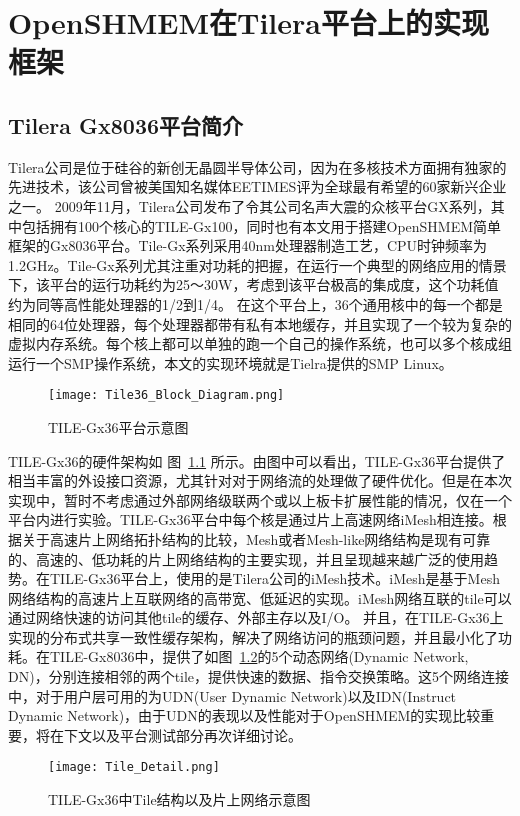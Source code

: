 \chapter{OpenSHMEM在Tilera平台上的实现框架}
\section{Tilera Gx8036平台简介}

Tilera公司是位于硅谷的新创无晶圆半导体公司，因为在多核技术方面拥有独家的先进技术，该公司曾被美国知名媒体EETIMES评为全球最有希望的60家新兴企业之一。
2009年11月，Tilera公司发布了令其公司名声大震的众核平台GX系列，其中包括拥有100个核心的TILE-Gx100，同时也有本文用于搭建OpenSHMEM简单框架的Gx8036平台。Tile-Gx系列采用40nm处理器制造工艺，CPU时钟频率为1.2GHz。Tile-Gx系列尤其注重对功耗的把握，在运行一个典型的网络应用的情景下，该平台的运行功耗约为25～30W，考虑到该平台极高的集成度，这个功耗值约为同等高性能处理器的1/2到1/4。
在这个平台上，36个通用核中的每一个都是相同的64位处理器，每个处理器都带有私有本地缓存，并且实现了一个较为复杂的虚拟内存系统。每个核上都可以单独的跑一个自己的操作系统，也可以多个核成组运行一个SMP操作系统，本文的实现环境就是Tielra提供的SMP Linux。

\begin{figure}
\centering
\texttt{[image: Tile36\_Block\_Diagram.png]}
\caption{TILE-Gx36平台示意图}\label{fig:TILEs-DIA}
\end{figure}

TILE-Gx36的硬件架构如 图~\ref{fig:TILEs-DIA} 所示。由图中可以看出，TILE-Gx36平台提供了相当丰富的外设接口资源，尤其针对对于网络流的处理做了硬件优化。但是在本次实现中，暂时不考虑通过外部网络级联两个或以上板卡扩展性能的情况，仅在一个平台内进行实验。TILE-Gx36平台中每个核是通过片上高速网络iMesh相连接。根据\cite{jour:NoC}关于高速片上网络拓扑结构的比较，Mesh或者Mesh-like网络结构是现有可靠的、高速的、低功耗的片上网络结构的主要实现，并且呈现越来越广泛的使用趋势。在TILE-Gx36平台上，使用的是Tilera公司的iMesh技术。iMesh是基于Mesh网络结构的高速片上互联网络的高带宽、低延迟的实现。iMesh网络互联的tile可以通过网络快速的访问其他tile的缓存、外部主存以及I/O。 并且，在TILE-Gx36上实现的分布式共享一致性缓存架构，解决了网络访问的瓶颈问题，并且最小化了功耗。在TILE-Gx8036中，提供了如图~\ref{fig:TILE-network}的5个动态网络(Dynamic Network, DN)，分别连接相邻的两个tile，提供快速的数据、指令交换策略。这5个网络连接中，对于用户层可用的为UDN(User Dynamic Network)以及IDN(Instruct Dynamic Network)，由于UDN的表现以及性能对于OpenSHMEM的实现比较重要，将在下文以及平台测试部分再次详细讨论。\\
\begin{figure}
\centering
\texttt{[image: Tile\_Detail.png]}
\caption{TILE-Gx36中Tile结构以及片上网络示意图}\label{fig:TILE-network}
\end{figure}

